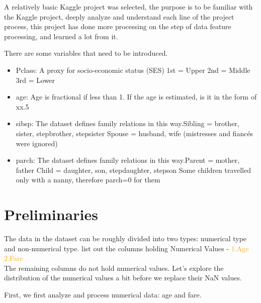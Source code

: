{}
A relatively basic Kaggle project was selected, the purpose is to be familiar with the Kaggle project, deeply analyze and understand each line of the project process, this project has done more processing on the step of data feature processing, and learned a lot from it.

There are some variables that need to be introduced.
\begin{itemize}
	\item Pclass: A proxy for socio-economic status (SES) 1st = Upper 2nd = Middle 3rd = Lower
	\item age: Age is fractional if less than 1. If the age is estimated, is it in the form of xx.5
	\item sibsp: The dataset defines family relations in this way.Sibling = brother, sister, stepbrother, stepsister Spouse = husband, wife (mistresses and fiancés were ignored)
	\item parch: The dataset defines family relations in this way.Parent = mother, father Child = daughter, son, stepdaughter, stepson Some children travelled only with a nanny, therefore parch=0 for them
\end{itemize}

\section{Preliminaries} \label{sec-preliminaries}

The data in the dataset can be roughly divided into two types: numerical type and non-numerical type.
list out the columns holding Numerical Values - \textcolor{orange}{1.Age  2.Fare} \\
The remaining columns do not hold numerical values. Let's explore the distribution of the numerical values a bit before we replace their NaN values.


First, we first analyze and process numerical data: age and fare.


